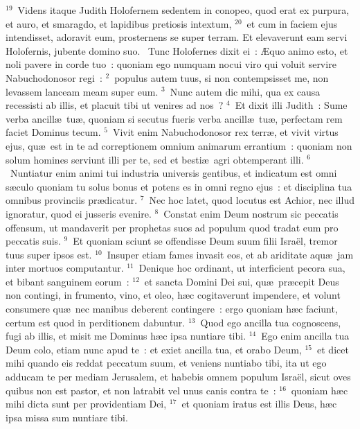 ${}^{19}$~Videns itaque Judith Holofernem sedentem in conopeo, quod erat ex purpura, et auro, et smaragdo, et lapidibus pretiosis intextum,
${}^{20}$~et cum in faciem ejus intendisset, adoravit eum, prosternens se super terram. Et elevaverunt eam servi Holofernis, jubente domino suo.
~Tunc Holofernes dixit ei~: \AE quo animo esto, et noli pavere in corde tuo~: quoniam ego numquam nocui viro qui voluit servire Nabuchodonosor regi~:
${}^{2}$~populus autem tuus, si non contempsisset me, non levassem lanceam meam super eum.
${}^{3}$~Nunc autem dic mihi, qua ex causa recessisti ab illis, et placuit tibi ut venires ad nos~?
${}^{4}$~Et dixit illi Judith~: Sume verba ancill\ae\ tu\ae , quoniam si secutus fueris verba ancill\ae\ tu\ae , perfectam rem faciet Dominus tecum.
${}^{5}$~Vivit enim Nabuchodonosor rex terr\ae , et vivit virtus ejus, qu\ae\ est in te ad correptionem omnium animarum errantium~: quoniam non solum homines serviunt illi per te, sed et besti\ae\ agri obtemperant illi.
${}^{6}$~Nuntiatur enim animi tui industria universis gentibus, et indicatum est omni s\ae culo quoniam tu solus bonus et potens es in omni regno ejus~: et disciplina tua omnibus provinciis pr\ae dicatur.
${}^{7}$~Nec hoc latet, quod locutus est Achior, nec illud ignoratur, quod ei jusseris evenire.
${}^{8}$~Constat enim Deum nostrum sic peccatis offensum, ut mandaverit per prophetas suos ad populum quod tradat eum pro peccatis suis.
${}^{9}$~Et quoniam sciunt se offendisse Deum suum filii Isra\"el, tremor tuus super ipsos est.
${}^{10}$~Insuper etiam fames invasit eos, et ab ariditate aqu\ae\ jam inter mortuos computantur.
${}^{11}$~Denique hoc ordinant, ut interficient pecora sua, et bibant sanguinem eorum~:
${}^{12}$~et sancta Domini Dei sui, qu\ae\ pr\ae cepit Deus non contingi, in frumento, vino, et oleo, h\ae c cogitaverunt impendere, et volunt consumere qu\ae\ nec manibus deberent contingere~: ergo quoniam h\ae c faciunt, certum est quod in perditionem dabuntur.
${}^{13}$~Quod ego ancilla tua cognoscens, fugi ab illis, et misit me Dominus h\ae c ipsa nuntiare tibi.
${}^{14}$~Ego enim ancilla tua Deum colo, etiam nunc apud te~: et exiet ancilla tua, et orabo Deum,
${}^{15}$~et dicet mihi quando eis reddat peccatum suum, et veniens nuntiabo tibi, ita ut ego adducam te per mediam Jerusalem, et habebis omnem populum Isra\"el, sicut oves quibus non est pastor, et non latrabit vel unus canis contra te~:
${}^{16}$~quoniam h\ae c mihi dicta sunt per providentiam Dei,
${}^{17}$~et quoniam iratus est illis Deus, h\ae c ipsa missa sum nuntiare tibi.
